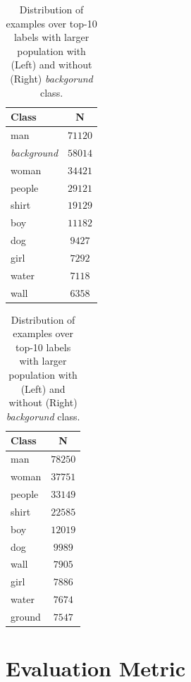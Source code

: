 \begin{table}
  \begin{subtable}{.5\linewidth}
    \centering
    \begin{tabular}{lc}
      Class                & N       \\\hline
      man                  & $71120$ \\
      \textit{background}  & $58014$ \\
      woman                & $34421$ \\
      people               & $29121$ \\
      shirt                & $19129$ \\
      boy                  & $11182$ \\
      dog                  & $9427$  \\
      girl                 & $7292$  \\
      water                & $7118$  \\
      wall                 & $6358$  \\
    \end{tabular}
  \end{subtable}%
  \begin{subtable}{.5\linewidth}
    \centering
    \begin{tabular}{lc}
      Class  & N       \\\hline
      man    & $78250$ \\
      woman  & $37751$ \\
      people & $33149$ \\
      shirt  & $22585$ \\
      boy    & $12019$ \\
      dog    & $9989$  \\
      wall   & $7905$  \\
      girl   & $7886$  \\
      water  & $7674$  \\
      ground & $7547$  \\
    \end{tabular}
  \end{subtable} 
  \caption{Distribution of examples over top-10 labels with larger population with (Left) and without (Right) \textit{backgorund} class.}
  \label{tab:flickr30k-label-data-top10}
\end{table}

\section{Evaluation Metric}
\label{sec:evaluation-metric}

